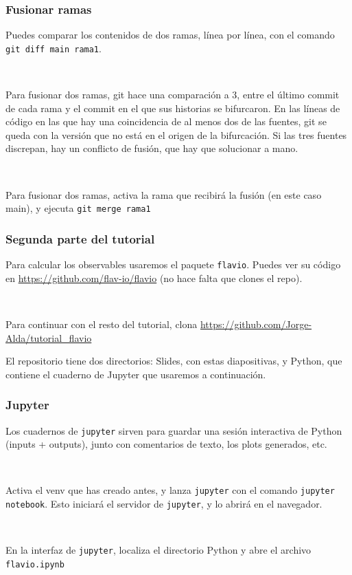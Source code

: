 \documentclass[mathserif, 10pt]{beamer}
\begin{document}
\begin{frame}\frametitle{Fusionar ramas}

    Puedes comparar los contenidos de dos ramas, línea por línea, con el comando \texttt{git diff main rama1}.

    ~

    Para fusionar dos ramas, git hace una comparación a 3, entre el último commit de cada rama y el commit en el que sus historias se bifurcaron. En las líneas de código en las que hay una coincidencia de al menos dos de las fuentes, git se queda con la versión que no está en el origen de la bifurcación. Si las tres fuentes discrepan, hay un conflicto de fusión, que hay que solucionar a mano.

    ~

    Para fusionar dos ramas, activa la rama que recibirá la fusión (en este caso main), y ejecuta \texttt{git merge rama1}
\end{frame}

\begin{frame}\frametitle{Segunda parte del tutorial}

    Para calcular los observables usaremos el paquete \texttt{flavio}. Puedes ver su código en \url{https://github.com/flav-io/flavio} (no hace falta que clones el repo).

    ~

    Para continuar con el resto del tutorial, clona \url{https://github.com/Jorge-Alda/tutorial_flavio}


    El repositorio tiene dos directorios: Slides, con estas diapositivas, y Python, que contiene el cuaderno de Jupyter que usaremos a continuación.
\end{frame}

\begin{frame}\frametitle{Jupyter}

    Los cuadernos de \texttt{jupyter} sirven para guardar una sesión interactiva de Python (inputs + outputs), junto con comentarios de texto, los plots generados, etc.

    ~

    Activa el venv que has creado antes, y lanza \texttt{jupyter} con el comando \texttt{jupyter notebook}. Esto iniciará el servidor de \texttt{jupyter}, y lo abrirá en el navegador.

    ~

    En la interfaz de \texttt{jupyter}, localiza el directorio Python y abre el archivo \texttt{flavio.ipynb}

\end{frame}
\end{document}
